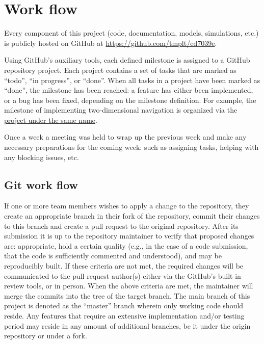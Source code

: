 \section{Work flow}
\label{sec:workflow}
Every component of this project (code, documentation, models, simulations, etc.) is publicly hosted on GitHub at \href{https://github.com/tmplt/ed7039e}{https://github.com/tmplt/ed7039e}.

Using GitHub's auxiliary tools, each defined milestone is assigned to a GitHub repository project.
Each project contains a set of tasks that are marked as ``todo'', ``in progress'', or ``done''.
When all tasks in a project have been marked as ``done'', the milestone has been reached:
a feature has either been implemented, or a bug has been fixed, depending on the milestone definition.
For example, the milestone of implementing two-dimensional navigation is organized via the \href{https://github.com/tmplt/ed7039e/projects/1}{project under the same name}.

Once a week a meeting was held to wrap up the previous week and make any necessary preparations for the coming week:
such as assigning tasks, helping with any blocking issues, etc.

\subsection{Git work flow}
If one or more team members wishes to apply a change to the repository,
they create an appropriate branch in their fork of the repository,
commit their changes to this branch and create a pull request to the original repository.
After its submission it is up to the repository maintainer to verify that proposed changes are:
appropriate,
hold a certain quality (e.g., in the case of a code submission, that the code is sufficiently commented and understood),
and may be reproducibly built. %
If these criteria are not met, the required changes will be communicated to the pull request author(s) either via the GitHub's built-in review tools, or in person.
When the above criteria are met, the maintainer will merge the commits into the tree of the target branch.
The main branch of this project is denoted as the ``master'' branch wherein only working code should reside.
Any features that require an extensive implementation and/or testing period may reside in any amount of additional branches,
be it under the origin repository or under a fork.
